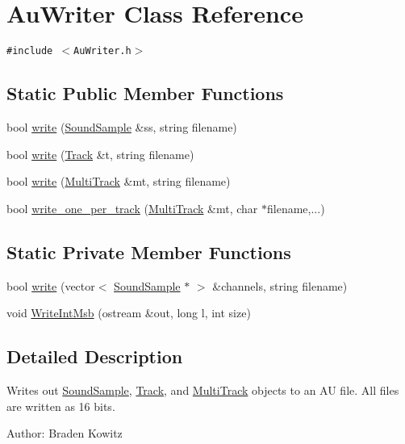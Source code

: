 \hypertarget{classAuWriter}{
\section{Au\-Writer Class Reference}
\label{classAuWriter}
}
{\tt \#include $<$Au\-Writer.h$>$}

\subsection*{Static Public Member Functions}
\begin{CompactItemize}
\item 
bool \hyperlink{classAuWriter_e0}{write} (\hyperlink{classSoundSample}{Sound\-Sample} \&ss, string filename)
\item 
bool \hyperlink{classAuWriter_e1}{write} (\hyperlink{classTrack}{Track} \&t, string filename)
\item 
bool \hyperlink{classAuWriter_e2}{write} (\hyperlink{classMultiTrack}{Multi\-Track} \&mt, string filename)
\item 
bool \hyperlink{classAuWriter_e3}{write\_\-one\_\-per\_\-track} (\hyperlink{classMultiTrack}{Multi\-Track} \&mt, char $\ast$filename,...)
\end{CompactItemize}
\subsection*{Static Private Member Functions}
\begin{CompactItemize}
\item 
bool \hyperlink{classAuWriter_h0}{write} (vector$<$ \hyperlink{classSoundSample}{Sound\-Sample} $\ast$ $>$ \&channels, string filename)
\item 
void \hyperlink{classAuWriter_h1}{Write\-Int\-Msb} (ostream \&out, long l, int size)
\end{CompactItemize}


\subsection{Detailed Description}
Writes out \hyperlink{classSoundSample}{Sound\-Sample}, \hyperlink{classTrack}{Track}, and \hyperlink{classMultiTrack}{Multi\-Track} objects to an AU file. All files are written as 16 bits. \begin{Desc}
\item[Author:]Braden Kowitz \end{Desc}




